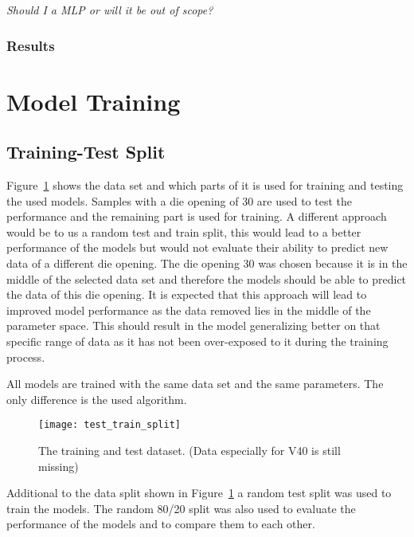 \textit{Should I a MLP or will it be out of scope?}

\subsubsection*{Results}

\section{Model Training}\label{sec:model-training}

\subsection{Training-Test Split}\label{subsec:training-test-split}
Figure~\ref{fig:train_test_split} shows the data set and which parts of it is used for training
and testing the used
models. Samples with a die opening of 30 are used to test the performance and the remaining part
is used for training.
A different approach would be to us a random test and train split, this would lead to a better
performance of the
models but would not evaluate their ability to predict new data of a different die opening.
The die opening 30 was chosen because it is in the middle of the selected data set and therefore
the models should be
able to predict the data of this die opening.
It is expected that this approach will lead to improved model performance as the data removed
lies in the middle of the parameter space.
This should result in the model generalizing better on that specific range of data as it has not
been over-exposed to it during the training process.

All models are trained with the same data set and the same parameters. The only difference is the
used algorithm.

\begin{figure}[H]
    \begin{tcolorbox}[arc=0pt,boxrule=0.5pt]
        \centering
        \texttt{[image: test\_train\_split]}
        \caption{The training and test dataset. (Data especially for V40 is still missing)}
        \label{fig:train_test_split}
    \end{tcolorbox}
\end{figure}

Additional to the data split shown in Figure~\ref{fig:train_test_split} a random test split was
used to train the
models. The random 80/20 split was also used to evaluate the performance of the models and to
compare them to each
other.

